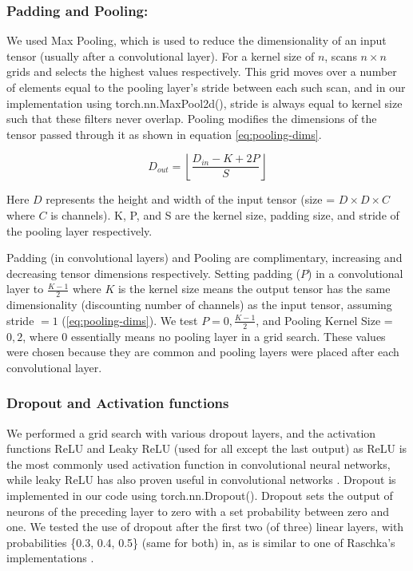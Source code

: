 \subsubsection{Padding and Pooling:}

We used Max Pooling, which is used to reduce the dimensionality of an input tensor (usually after a convolutional layer). For a kernel size of $n$, scans $n\times n$ grids and selects the highest values respectively. This grid moves over a number of elements equal to the pooling layer's stride between each such scan, and in our implementation using torch.nn.MaxPool2d(), stride is always equal to kernel size such that these filters never overlap. Pooling modifies the dimensions of the tensor passed through it as shown in equation \ref{eq:pooling-dims}.

\begin{equation}
    D_{out} = \left\lfloor\frac {D_{in} -K + 2P}{S}\right\rfloor
    \label{eq:pooling-dims}
\end{equation}


Here $D$ represents the height and width of the input tensor (size = $D\times D \times C$ where $C$ is channels). K, P, and S are the kernel size, padding size, and stride of the pooling layer respectively.

Padding (in convolutional layers) and Pooling are complimentary, increasing and decreasing tensor dimensions respectively. Setting padding ($P$) in a convolutional layer to $\frac {K-1}2$ where $K$ is the kernel size means the output tensor has the same dimensionality (discounting number of channels) as the input tensor, assuming stride $= 1$ (\ref{eq:pooling-dims}). We test $P = 0,\frac {K-1}2$, and Pooling Kernel Size = $0,2$, where $0$ essentially means no pooling layer in a grid search. These values were chosen because they are common and pooling layers were placed after each convolutional layer.

\subsubsection{Dropout and Activation functions}
We performed a grid search with various dropout layers, and the activation functions ReLU and Leaky ReLU (used for all except the last output) as ReLU is the most commonly used activation function in convolutional neural networks, while leaky ReLU has also proven useful in convolutional networks \cite {activation_functions}. Dropout is implemented in our code using torch.nn.Dropout(). Dropout sets the output of neurons of the preceding layer to zero with a set probability between zero and one. We tested the use of dropout after the first two (of three) linear layers, with probabilities \{0.3, 0.4, 0.5\} (same for both) in, as is similar to one of Raschka's implementations \cite[p. 478]{raschka2022machine}.


